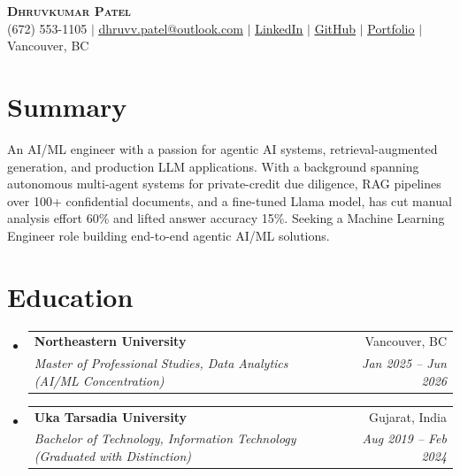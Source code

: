 \documentclass[letterpaper,11pt]{article}
\makeatletter
\newcommand{\resumeSubheading}[4]{
  \vspace{-2pt}\item
    \begin{tabular*}{0.97\textwidth}[t]{l@{\extracolsep{\fill}}r}
      \textbf{#1} & #2 \\
      \textit{\small#3} & \textit{\small #4} \\
    \end{tabular*}\vspace{-7pt}
}
\newcommand{\resumeSubHeadingListStart}{\begin{itemize}[leftmargin=0.15in, label={}]}
\newcommand{\resumeSubHeadingListEnd}{\end{itemize}}
\makeatother
\begin{document}
\begin{center}
    \textbf{\Huge \scshape Dhruvkumar Patel} \\ \vspace{1pt}
    \small (672) 553-1105 $|$ \href{mailto:dhruvv.patel@outlook.com}{\underline{dhruvv.patel@outlook.com}} $|$
    \href{https://www.linkedin.com/in/dhruvkumarpatell/}{\underline{LinkedIn}} $|$
    \href{https://github.com/pateldhruvkumar}{\underline{GitHub}} $|$
    \href{https://dhruvvkumarpatel.vercel.app/}{\underline{Portfolio}} $|$
    Vancouver, BC
\end{center}

\section{Summary}
  \small{An AI/ML engineer with a passion for agentic AI systems, retrieval-augmented generation, and production LLM applications. With a background spanning autonomous multi-agent systems for private-credit due diligence, RAG pipelines over 100+ confidential documents, and a fine-tuned Llama model, has cut manual analysis effort 60\% and lifted answer accuracy 15\%. Seeking a Machine Learning Engineer role building end-to-end agentic AI/ML solutions.}
  \vspace{-4pt}

\section{Education}
  \resumeSubHeadingListStart
    \resumeSubheading
      {Northeastern University}{Vancouver, BC}
      {Master of Professional Studies, Data Analytics (AI/ML Concentration)}{Jan 2025 -- Jun 2026}
    \resumeSubheading
      {Uka Tarsadia University}{Gujarat, India}
      {Bachelor of Technology, Information Technology (Graduated with Distinction)}{Aug 2019 -- Feb 2024}
  \resumeSubHeadingListEnd

\end{document}

